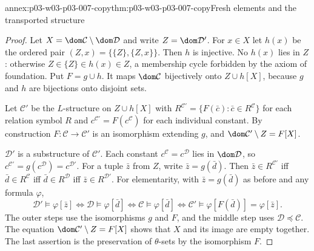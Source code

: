 \begin{annexitem}{annex:p03-w03-p03-007-copy}{thm:p03-w03-p03-007-copy}{Fresh elements and the transported structure}
\begin{proof}
Let \(X=\dom\mathcal C\setminus\dom\mathcal D\) and write
\(Z=\dom\mathcal D'\). For \(x\in X\) let \(h(x)\) be the ordered pair
\((Z,x)=\{\{Z\},\{Z,x\}\}\). Then \(h\) is injective. No \(h(x)\) lies in
\(Z\): otherwise \(Z\in\{Z\}\in h(x)\in Z\), a membership cycle forbidden by
the axiom of foundation. Put \(F=g\cup h\). It maps \(\dom\mathcal C\)
bijectively onto \(Z\cup h[X]\), because \(g\) and \(h\) are bijections onto
disjoint sets.

Let \(\mathcal C'\) be the \(L\)-structure on \(Z\cup h[X]\) with
\(R^{\mathcal C'}=\{F(\bar c):\bar c\in R^{\mathcal C}\}\) for each relation
symbol \(R\) and \(c^{\mathcal C'}=F(c^{\mathcal C})\) for each individual
constant. By construction \(F\colon\mathcal C\to\mathcal C'\) is an
isomorphism extending \(g\), and
\(\dom\mathcal C'\setminus Z=F[X]\).

\(\mathcal D'\) is a substructure of \(\mathcal C'\). Each constant
\(c^{\mathcal C}=c^{\mathcal D}\) lies in \(\dom\mathcal D\), so
\(c^{\mathcal C'}=g(c^{\mathcal D})=c^{\mathcal D'}\). For a tuple \(\bar z\)
from \(Z\), write \(\bar z=g(\bar d)\). Then
\(\bar z\in R^{\mathcal C'}\) iff \(\bar d\in R^{\mathcal C}\) iff
\(\bar d\in R^{\mathcal D}\) iff \(\bar z\in R^{\mathcal D'}\).
For elementarity, with \(\bar z=g(\bar d)\) as before and any formula
\(\varphi\),
\[
 \mathcal D'\models\varphi[\bar z]
 \iff\mathcal D\models\varphi[\bar d]
 \iff\mathcal C\models\varphi[\bar d]
 \iff\mathcal C'\models\varphi[F(\bar d)]
 =\varphi[\bar z].
\]
The outer steps use the isomorphisms \(g\) and \(F\), and the middle step
uses \(\mathcal D\preccurlyeq\mathcal C\). The equation
\(\dom\mathcal C'\setminus Z=F[X]\) shows that \(X\) and its image are empty
together. The last assertion is the preservation of \(\theta\)-sets by the
isomorphism \(F\).
\end{proof}
\end{annexitem}

